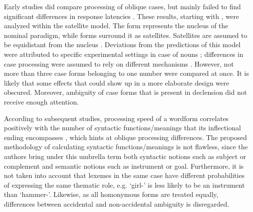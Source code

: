 \documentclass[output=paper, modfonts,newtxmath,hidelinks]{langscibook}
\begin{document}
Early  studies did compare processing of oblique cases, but mainly failed to find significant differences in response latencies \citep{lukatela1978lexical, lukatelaEtAl1980, lukatela1987lexical, katz1987grammatical, kostic1987processing, feldman1987inflected}. These results, starting with \citet{lukatelaEtAl1980}, were analyzed within the satellite model. The  form represents the nucleus of the nominal paradigm, while  forms surround it as satellites. Satellites are assumed to be equidistant from the nucleus \citep{feldman1987inflected}. Deviations from the predictions of this model were attributed to specific experimental settings in case of nouns \citep{feldman1987inflected, todorovic1988hemispheric}; differences in  case processing were assumed to rely on different mechanisms \citep{kostic1987processing}. However, not more than three case forms belonging to one number were compared at once. It is likely that some effects that could show up in a more elaborate design were obscured. Moreover, ambiguity of case forms that is present in  declension did not receive enough attention. 

According to subsequent  studies, processing speed of a wordform correlates positively with the number of syntactic functions\slash meanings that its inflectional ending encompasses \citep{kostic1991informational, kostic1995information, kostic2003inflectional, filipovic2003processing,vseva2003annotated}, which hints at oblique processing differences. The proposed methodology of calculating syntactic functions\slash meanings is not flawless, since the authors bring under this umbrella term both syntactic notions such as subject or complement and semantic notions such as instrument or goal. Furthermore, it is not taken into account that lexemes in the same case have different probabilities of expressing the same thematic role, e.g. `girl-\ins' is less likely to be an instrument than `hammer-\ins'. Likewise, as all homonymous forms are treated equally, differences between accidental and non-accidental ambiguity is disregarded.
\end{document}
